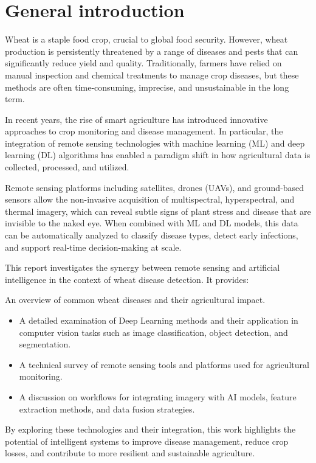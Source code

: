 \chapter*{General introduction}
\label{chap.intro}

Wheat is a staple food crop, crucial to global food security. However, wheat production is persistently threatened by a range of diseases and pests that can significantly reduce yield and quality. Traditionally, farmers have relied on manual inspection and chemical treatments to manage crop diseases, but these methods are often time-consuming, imprecise, and unsustainable in the long term.

In recent years, the rise of smart agriculture has introduced innovative approaches to crop monitoring and disease management. In particular, the integration of remote sensing technologies with machine learning (ML) and deep learning (DL) algorithms has enabled a paradigm shift in how agricultural data is collected, processed, and utilized.

Remote sensing platforms including satellites, drones (UAVs), and ground-based sensors allow the non-invasive acquisition of multispectral, hyperspectral, and thermal imagery, which can reveal subtle signs of plant stress and disease that are invisible to the naked eye. When combined with ML and DL models, this data can be automatically analyzed to classify disease types, detect early infections, and support real-time decision-making at scale.

This report investigates the synergy between remote sensing and artificial intelligence in the context of wheat disease detection. It provides:

An overview of common wheat diseases and their agricultural impact.

\begin{itemize}
    \item A detailed examination of Deep Learning methods and their application in computer vision tasks such as image classification, object detection, and segmentation.
    \item A technical survey of remote sensing tools and platforms used for agricultural monitoring.
    \item A discussion on workflows for integrating imagery with AI models, feature extraction methods, and data fusion strategies.
  \end{itemize}
  
By exploring these technologies and their integration, this work highlights the potential of intelligent systems to improve disease management, reduce crop losses, and contribute to more resilient and sustainable agriculture.